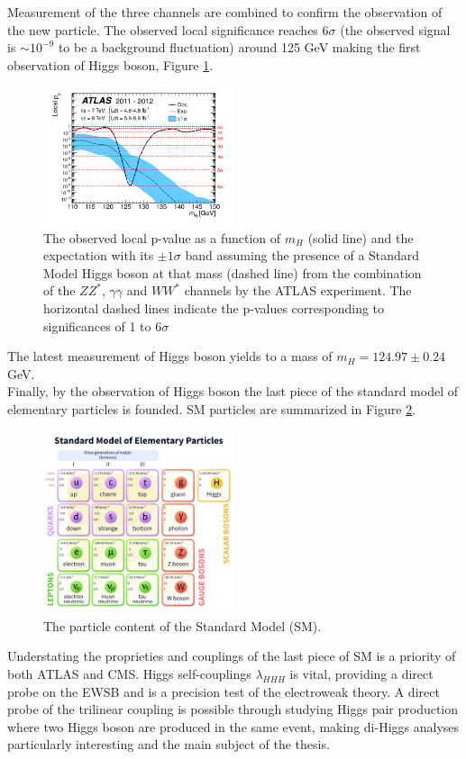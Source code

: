 Measurement of the three channels are combined to confirm the observation of the new particle. The observed local significance reaches $6\sigma$ (the observed signal is $\sim10^{-9}$ to be a background fluctuation) around 125 GeV making the first observation of Higgs boson, Figure \ref{fig:chap1:H2012:P0}.  
\begin{figure}[H]
    \centering
    \includegraphics[width=0.5\textwidth]{Ch1/Img/Hp0.png}
    \caption{The observed local p-value as a function of $m_H$ (solid line) and the expectation with its $\pm1\sigma$ band assuming the presence of a Standard Model Higgs boson at that mass (dashed line) from the combination of the $ZZ^*$, $\gamma\gamma$ and $WW^*$ channels by the ATLAS experiment. The horizontal dashed lines indicate the p-values corresponding to significances of 1 to 6$\sigma$}
    \label{fig:chap1:H2012:P0}
\end{figure}
The latest measurement of Higgs boson yields to a  mass of $m_{H}=124.97\pm0.24 $ GeV. \\
Finally, by the observation of Higgs boson the last piece of the standard model of elementary particles is founded. SM particles are summarized in Figure \ref{fig:chap1:H2012:SM}.
\begin{figure}[ht]
    \centering
    \includegraphics[width=0.5\textwidth]{Ch1/Img/SM_particles.png}
    \caption{The particle content of the Standard Model (SM).}
    \label{fig:chap1:H2012:SM}
\end{figure}
Understating the proprieties and couplings of the last piece of SM is a priority of both ATLAS and CMS. Higgs self-couplings $\lambda_{HHH}$ is vital, providing a direct probe on the EWSB and is a precision test of the electroweak theory. A direct probe of the trilinear coupling is possible through studying Higgs pair production where two Higgs boson are produced in the same event, making di-Higgs analyses particularly interesting and the main subject of the thesis.

